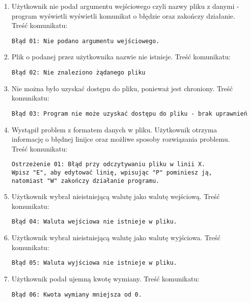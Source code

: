 \documentclass{article}
\begin{document}
\begin{enumerate}
\item Użytkownik nie podał argumentu wejściowego czyli nazwy pliku z danymi - program wyświetli wyświetli komunikat o błędzie oraz zakończy działanie. Treść komunikatu: \begin{verbatim}Błąd 01: Nie podano argumentu wejściowego.\end{verbatim}
\item Plik o podanej przez użytkownika nazwie nie istnieje. Treść komunikatu: \begin{verbatim}Błąd 02: Nie znaleziono żądanego pliku\end{verbatim}
\item Nie można było uzyskać dostępu do pliku, ponieważ jest chroniony. Treść komunikatu: \begin{verbatim}Błąd 03: Program nie może uzyskać dostępu do pliku - brak uprawnień\end{verbatim}
\item Wystąpił problem z formatem danych w pliku. Użytkownik otrzyma informację o błędnej linijce oraz możliwe sposoby rozwiązania problemu. Treść komunikatu:\begin{verbatim}Ostrzeżenie 01: Błąd przy odczytywaniu pliku w linii X.
Wpisz "E", aby edytować linię, wpisując "P" pominiesz ją,
natomiast "W" zakończy działanie programu. \end{verbatim}
\item Użytkownik wybrał nieistniejącą walutę jako walutę wejściową. Treść komunikatu:\begin{verbatim}Błąd 04: Waluta wejściowa nie istnieje w pliku.\end{verbatim}
\item Użytkownik wybrał nieistniejącą walutę jako walutę wyjściowa. Treść komunikatu:\begin{verbatim}Błąd 05: Waluta wyjściowa nie istnieje w pliku.\end{verbatim}
\item Użytkownik podał ujemną kwotę wymiany. Treść komunikatu:\begin{verbatim}Błąd 06: Kwota wymiany mniejsza od 0.\end{verbatim}
\end{enumerate}
\end{document}
